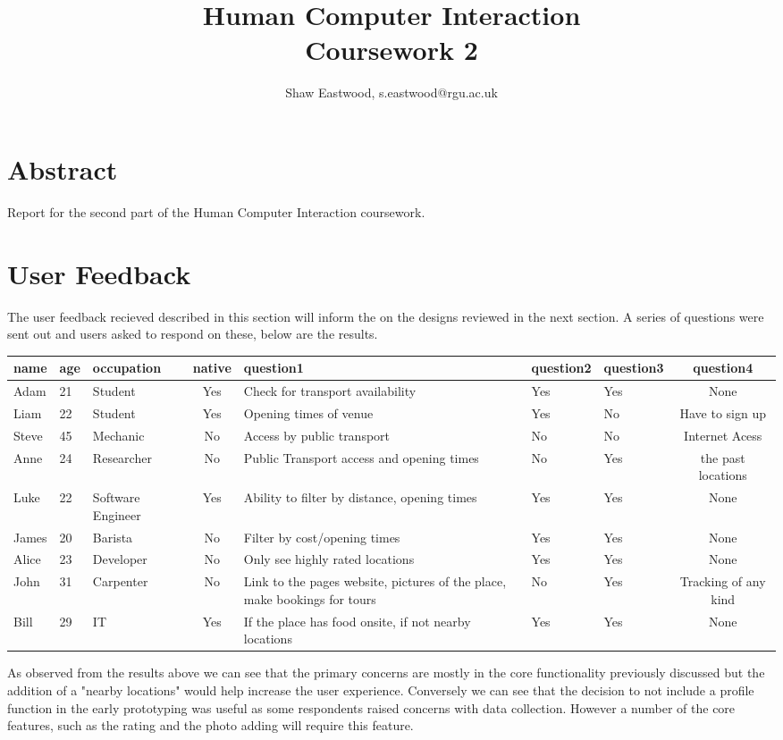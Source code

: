 \documentclass{article}
\title{Human Computer Interaction \\ Coursework 2}
\author{Shaw Eastwood, s.eastwood@rgu.ac.uk}
\begin{document}
	\maketitle
	\section{Abstract}
	Report for the second part of the Human Computer Interaction coursework.
	\section{User Feedback}
	The user feedback recieved described in this section will inform the on the designs reviewed in the next section.
	A series of questions were sent out and users asked to respond on these, below are the results.
\begin{table}[H]
\hspace{-3cm}
\begin{tabular}{lllcp{3cm}llc}
\hline
	name & age & occupation & native & question1 & question2 & question3 & question4 \\
\hline
	Adam & 21 & Student & Yes & Check for transport availability & Yes & Yes & None \\
	Liam & 22 & Student & Yes & Opening times of venue & Yes & No & Have to sign up \\
	Steve & 45 & Mechanic & No & Access by public transport & No & No & Internet Acess \\
	Anne & 24 & Researcher & No & Public Transport access and opening times & No & Yes & the past locations \\
	Luke & 22 & Software Engineer & Yes & Ability to filter by distance, opening times & Yes & Yes & None \\
	James & 20 & Barista & No & Filter by cost/opening times & Yes & Yes & None \\
	Alice & 23 & Developer & No & Only see highly rated locations & Yes & Yes & None \\
	John & 31 & Carpenter & No & Link to the pages website, pictures of the place, make bookings for tours & No & Yes & Tracking of any kind \\
	Bill & 29 & IT & Yes & If the place has food onsite, if not nearby locations & Yes & Yes & None \\
\hline
\end{tabular}
\end{table}
	As observed from the results above we can see that the primary concerns are mostly in the core functionality previously discussed but the addition of a "nearby locations" would help increase the user experience.
	Conversely we can see that the decision to not include a profile function in the early prototyping was useful as some respondents raised concerns with data collection.
	However a number of the core features, such as the rating and the photo adding will require this feature.
\end{document}
